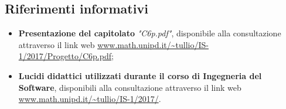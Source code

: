 \documentclass[AnalisiDeiRequisiti.tex]{subfiles}
\begin{document}
\subsection{Riferimenti informativi}
\begin{itemize}
	\item \textbf{Presentazione del capitolato} \textit{"C6p.pdf"}, disponibile  alla consultazione attraverso il link web \url{www.math.unipd.it/~tullio/IS-1/2017/Progetto/C6p.pdf};
	\item \textbf{Lucidi didattici utilizzati durante il corso di Ingegneria del Software}, disponibili alla consultazione attraverso il link web \url{www.math.unipd.it/~tullio/IS-1/2017/}.
\end{itemize}
\end{document}
